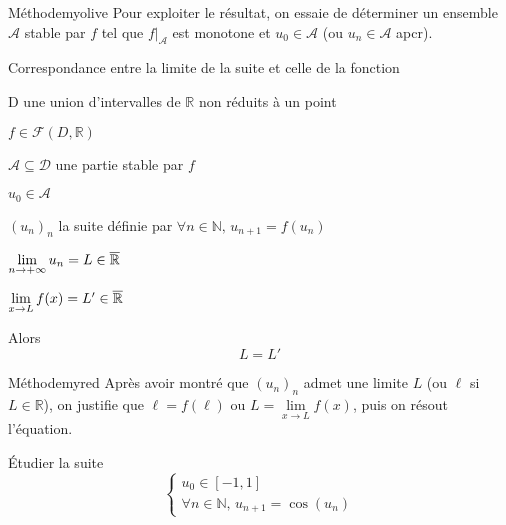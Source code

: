     \begin{omed}{Méthode}{myolive}
        Pour exploiter le résultat, on essaie de déterminer un ensemble $\mathcal{A}$ stable par $f$ tel que $f \vert_{\mathcal{A}}$ est monotone et $u_0 \in \mathcal{A}$ (ou $u_n \in \mathcal{A}$ apcr).
    \end{omed}

    \begin{theo}{Correspondance entre la limite de la suite et celle de la fonction}{}
        \begin{soient}
            \item D une union d’intervalles de $\mathbb{R}$ non réduits à un point
            \item $f \in \mathcal{F}(D, \mathbb{R})$
            \item $\mathcal{A} \subseteq \mathcal{D}$ une partie stable par $f$
            \item $u_0 \in \mathcal{A}$
            \item $(u_n)_n$ la suite définie par $\forall n \in \mathbb{N}, \, u_{n+1} = f(u_n)$
        \end{soient}
        \begin{suppose}
            \item $\lim\limits_{n \rightarrow +\infty} u_n = L \in \overline{\mathbb{R}}$
            \item $\lim\limits_{x \rightarrow L} f(x) = L' \in \overline{\mathbb{R}}$
        \end{suppose}
        Alors \[ L = L' \]
    \end{theo}

    \begin{omed}{Méthode}{myred}
        Après avoir montré que $(u_n)_n$ admet une limite $L$ (ou $\ell$ si $L \in \mathbb{R}$), on justifie que $\ell = f(\ell)$ ou $L = \lim\limits_{x \rightarrow L} f(x)$, puis on résout l’équation.
    \end{omed}

    \begin{exo}{}{}
        Étudier la suite 
        \[ \left\{ \begin{array}{ll}
            u_0 \in [-1,1] \\
            \forall n \in \mathbb{N}, \, u_{n+1} = \cos(u_n)
        \end{array} \right. \]
    \end{exo}

